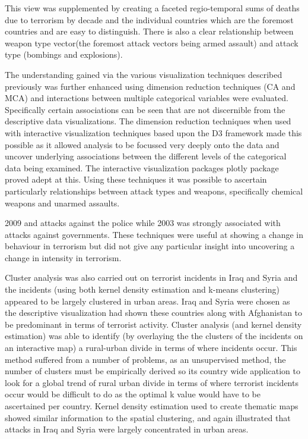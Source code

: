 This view was supplemented by creating a faceted regio-temporal sums of deaths due to terrorism by decade and the individual countries which are the foremost countries and are easy to distinguish. There is also a clear relationship between weapon type vector(the foremost attack vectors being armed assault) and attack type (bombings and explosions). 

The understanding gained via the various visualization techniques described previously was further enhanced using dimension reduction techniques (CA and MCA) and interactions between multiple categorical variables were evaluated. Specifically certain associations can be seen that are not discernible from the descriptive data visualizations. The dimension reduction techniques when used with interactive visualization techniques based upon the D3 framework made this possible as it allowed analysis to be focussed very deeply onto the data and uncover underlying associations between the different levels of the categorical data being examined. The interactive visualization packages plotly package proved adept at this. Using these techniques it was possible to ascertain particularly relationships between attack types and weapons, specifically chemical weapons and unarmed assaults. 

2009 and attacks against the police while 2003 was strongly associated with attacks against governments. These techniques were useful at showing a change in behaviour in terrorism but did not give any particular insight into uncovering a change in intensity in terrorism.

Cluster analysis was also carried out on terrorist incidents in Iraq and Syria and the incidents (using both kernel density estimation and k-means clustering) appeared to be largely clustered in urban areas. Iraq and Syria were chosen as the descriptive visualization had shown these countries along with Afghanistan to be predominant in terms of terrorist activity. Cluster analysis (and kernel density estimation) was able to identify (by overlaying the the clusters of the incidents on an interactive map) a rural-urban divide in terms of where incidents occur. This method suffered from a number of problems, as an unsupervised method, the number of clusters must be empirically derived so its country wide application to look for a global trend of rural urban divide in terms of where terrorist incidents occur would be difficult to do as the optimal k value would have to be ascertained per country. Kernel density estimation used to create thematic maps showed similar information to the spatial clustering, and again illustrated that attacks in Iraq and Syria were largely concentrated in urban areas.

